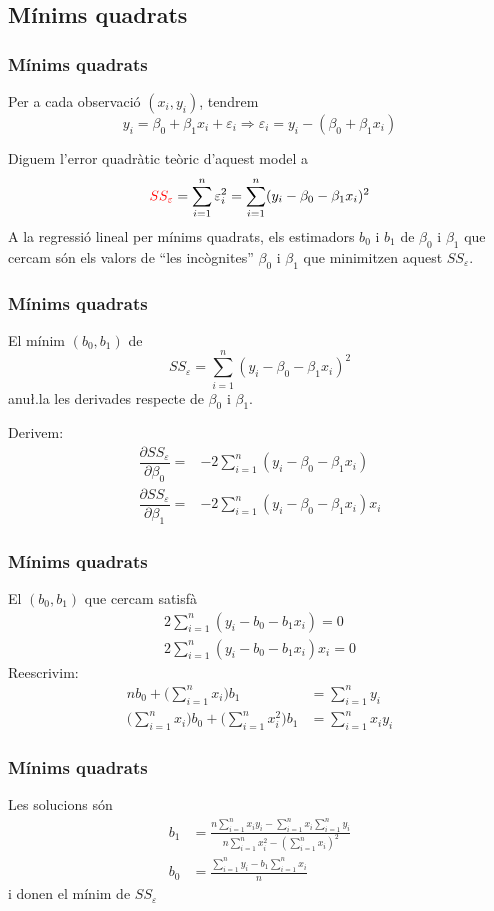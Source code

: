 \documentclass[12pt,t]{beamer}
\newcommand{\red}[1]{\textcolor{red}{#1}}
\renewcommand{\emph}[1]{{\color{red}#1}}
\theoremstyle{plain}
\theoremstyle{definition}
\begin{document}
\subsection{Mínims quadrats}

\begin{frame}
\frametitle{Mínims quadrats}

Per a cada observació $(x_i,y_i)$, tendrem
$$
y_i=\beta_0+\beta_1 x_i+ \varepsilon_i\Rightarrow \varepsilon_i=y_i-(\beta_0+\beta_1 x_i)
$$
\smallskip

Diguem l'\emph{error quadràtic teòric} d'aquest model a
$$
\red{SS_\varepsilon}=\sum_{i=1}^n \varepsilon_i^2=\sum_{i=1}^n (y_i-\beta_0-\beta_1 x_i)^2
$$
A la \emph{regressió lineal per mínims quadrats}, els estimadors $b_0$ i $b_1$ de $\beta_0$ i $\beta_1$ que cercam són els valors de ``les incògnites''  $\beta_0$ i $\beta_1$ que minimitzen aquest  $SS_\varepsilon$.
\end{frame}

\begin{frame}
\frametitle{Mínims quadrats}
El mínim $(b_0,b_1)$ de
$$
SS_\varepsilon=\sum_{i=1}^n (y_i-\beta_0-\beta_1 x_i)^2
$$
anu\l.la les derivades respecte de $\beta_0$ i $\beta_1$.
\medskip

Derivem:
$$
\begin{array}{ll}
\dfrac{\partial SS_\varepsilon}{\partial \beta_0}=&-2\sum\limits_{i=1}^n (y_i -\beta_0-\beta_1 x_i)\\[2ex]
\dfrac{\partial SS_\varepsilon}{\partial \beta_1}=&-2\sum\limits_{i=1}^n (y_i -\beta_0-\beta_1 x_i) x_i 
\end{array}
$$
\end{frame}

\begin{frame}
\frametitle{Mínims quadrats}
El $(b_0,b_1)$ que cercam satisfà
$$
\begin{array}{l}
2\sum\limits_{i=1}^n (y_i -b_0-b_1 x_i)=0\\[2ex]
2\sum\limits_{i=1}^n (y_i -b_0-b_1 x_i) x_i =0
\end{array}
$$
Reescrivim:
$$
\begin{array}{rl}
n b_0 + \Big(\sum\limits_{i=1}^n x_i\Big) b_1 & =\sum\limits_{i=1}^n y_i\\[1ex]
\Big(\sum\limits_{i=1}^n x_i\Big) b_0 + \Big(\sum\limits_{i=1}^n x_i^2\Big) b_1 &=\sum\limits_{i=1}^n x_iy_i
\end{array}
$$
\end{frame}

\begin{frame}
\frametitle{Mínims quadrats}
Les solucions són
$$
\begin{array}{rl}
b_1& \displaystyle=\frac{n \sum\limits_{i=1}^n x_i y_i-\sum\limits_{i=1}^n x_i\sum\limits_{i=1}^n y_i} {n\sum\limits_{i=1}^n
x_i^2-(\sum\limits_{i=1}^n x_i)^2}\\[6ex]
b_0& \displaystyle=\frac{\sum\limits_{i=1}^n y_i -b_1 \sum\limits_{i=1}^n x_i}{n}
\end{array}
$$
i  donen el mínim de $SS_\varepsilon$
\end{frame}
\end{document}
